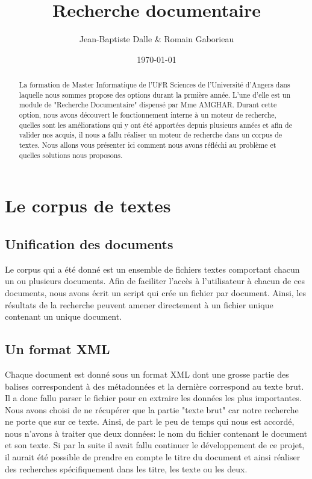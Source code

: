 \documentclass[a4paper,10pt]{report}
\title{Recherche documentaire}
\author{Jean-Baptiste Dalle \& Romain Gaborieau}
\date{\today}
\begin{document}
\maketitle

\newpage

\begin{abstract}

La formation de Master Informatique de l'UFR Sciences de l'Universit\'e d'Angers dans laquelle nous sommes propose des options durant la prmi\`ere ann\'ee. L'une d'elle est un module de "Recherche Documentaire" dispens\'e par Mme AMGHAR. Durant cette option, nous avons d\'ecouvert le fonctionnement interne \`a un moteur de recherche, quelles sont les am\'eliorations qui y ont \'et\'e apport\'ees depuis plusieurs ann\'ees et afin de valider nos acquis, il nous a fallu r\'ealiser un moteur de recherche dans un corpus de textes. Nous allons vous pr\'esenter ici comment nous avons r\'efl\'echi au probl\`eme et quelles solutions nous proposons.

\end{abstract}

\section{Le corpus de textes}

\subsection{Unification des documents}

Le corpus qui a \'et\'e donn\'e est un ensemble de fichiers textes comportant chacun un ou plusieurs documents. Afin de faciliter l'acc\`es \`a l'utilisateur \`a chacun de ces documents, nous avons \'ecrit un script qui cr\'ee un fichier par document. Ainsi, les r\'esultats de la recherche peuvent amener directement \`a un fichier unique contenant un unique document.

\subsection{Un format XML}

Chaque document est donn\'e sous un format XML dont une grosse partie des balises correspondent \`a des m\'etadonn\'ees et la derni\`ere correspond au texte brut. Il a donc fallu parser le fichier pour en extraire les donn\'ees les plus importantes. Nous avons choisi de ne r\'ecup\'erer que la partie "texte brut" car notre recherche ne porte que sur ce texte. Ainsi, de part le peu de temps qui nous est accord\'e, nous n'avons \`a traiter que deux donn\'ees: le nom du fichier contenant le document et son texte. Si par la suite il avait fallu continuer le d\'eveloppement de ce projet, il aurait \'et\'e possible de prendre en compte le titre du document et ainsi r\'ealiser des recherches sp\'ecifiquement dans les titre, les texte ou les deux. 
\end{document}
